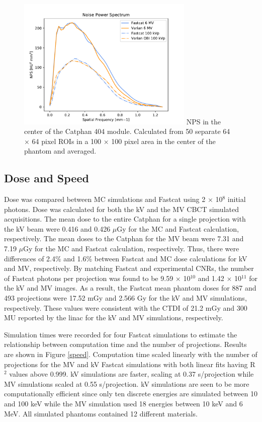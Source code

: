 \begin{figure}[ht!]
  \begin{center}
  \includegraphics[width=0.75\textwidth, clip]{figures/NPS.pdf}
  {NPS in the center of the Catphan 404 module. Calculated from 50 separate 64 $\times$ 64 pixel ROIs in a 100 $\times$ 100 pixel area in the center of the phantom and averaged. \label{NPS}}
    \end{center}
\end{figure}

\subsection{Dose and Speed}

Dose was compared between MC simulations and Fastcat using 2 $\times$ 10$^8$ initial photons. Dose was calculated for both the kV and the MV CBCT simulated acquisitions. The mean dose to the entire Catphan for a single projection with the kV beam were 0.416 and 0.426 $\mu$Gy for the MC and Fastcat calculation, respectively. The mean doses to the Catphan for the MV beam were 7.31 and 7.19 $\mu$Gy for the MC and Fastcat calculation, respectively. Thus, there were differences of 2.4\% and 1.6\% between Fastcat and MC dose calculations for kV and MV, respectively. By matching Fastcat and experimental CNRs, the number of Fastcat photons per projection was found to be 9.59 $\times$ 10$^{10}$ and 1.42 $\times$ 10$^{11}$ for the kV and MV images. As a result, the Fastcat mean phantom doses for 887 and 493 projections were 17.52 mGy and 2.566 Gy for the kV and MV simulations, respectively. These values were  consistent with the CTDI of 21.2 mGy and 300 MU reported by the linac for the kV and MV simulations, respectively.


Simulation times were recorded for four Fastcat simulations to estimate the relationship between computation time and the number of projections. Results are shown in Figure \ref{speed}. Computation time scaled linearly with the number of projections for the MV and kV Fastcat simulations with both linear fits having R$^2$ values above 0.999. kV simulations are faster, scaling at 0.37 s/projection while MV simulations scaled at 0.55 s/projection. kV simulations are seen to be more computationally efficient since only ten discrete energies are simulated between 10 and 100 keV while the MV simulation used 18 energies between 10 keV and 6 MeV. All simulated phantoms contained 12 different materials.

